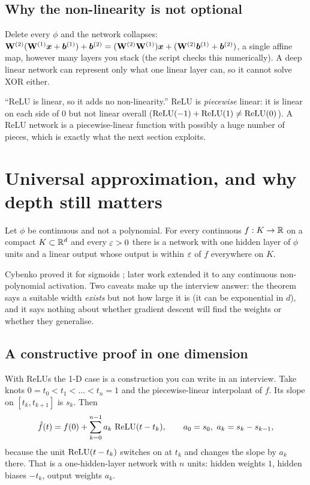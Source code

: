 
\subsection{Why the non-linearity is not optional}
Delete every $\phi$ and the network collapses:
${\mathbf{W}}^{(2)}({\mathbf{W}}^{(1)}{\bm{x}}+{\bm{b}}^{(1)})+{\bm{b}}^{(2)} = ({\mathbf{W}}^{(2)}{\mathbf{W}}^{(1)}){\bm{x}} +
({\mathbf{W}}^{(2)}{\bm{b}}^{(1)}+{\bm{b}}^{(2)})$, a single affine map, however many layers you stack
(the script checks this numerically). A deep linear network can represent only
what one linear layer can, so it cannot solve XOR either.

\begin{remark}
	\trap ``ReLU is linear, so it adds no non-linearity.'' ReLU is \emph{piecewise}
	linear: it is linear on each side of $0$ but not linear overall
	($\operatorname{ReLU}(-1)+\operatorname{ReLU}(1)\neq\operatorname{ReLU}(0)$). A ReLU network is a piecewise-linear function
	with possibly a huge number of pieces, which is exactly what the next section
	exploits.
\end{remark}

\section{Universal approximation, and why depth still matters}

\begin{theorem}
	Let $\phi$ be continuous and not a polynomial. For every continuous
	$f:K\to\mathbb R$ on a compact $K\subset\mathbb R^d$ and every $\varepsilon>0$ there is a network
	with one hidden layer of $\phi$ units and a linear output whose output is within
	$\varepsilon$ of $f$ everywhere on $K$.
\end{theorem}
Cybenko proved it for sigmoids \cite{cybenko}; later work extended it to any
continuous non-polynomial activation. Two caveats make up the interview answer:
the theorem says a suitable width \emph{exists} but not how large it is (it can be
exponential in $d$), and it says nothing about whether gradient descent will find
the weights or whether they generalise.

\subsection{A constructive proof in one dimension}
With ReLUs the 1-D case is a construction you can write in an interview. Take
knots $0=t_0<t_1<\dots<t_n=1$ and the piecewise-linear interpolant of $f$. Its slope
on $[t_{k},t_{k+1}]$ is $s_k$. Then
\[
	\hat f(t) = f(0) + \sum_{k=0}^{n-1} a_k\,\operatorname{ReLU}(t-t_k),\qquad
	a_0=s_0,\ a_k=s_k-s_{k-1},
\]
because the unit $\operatorname{ReLU}(t-t_k)$ switches on at $t_k$ and changes the slope by
$a_k$ there. That is a one-hidden-layer network with $n$ units: hidden weights $1$,
hidden biases $-t_k$, output weights $a_k$.

